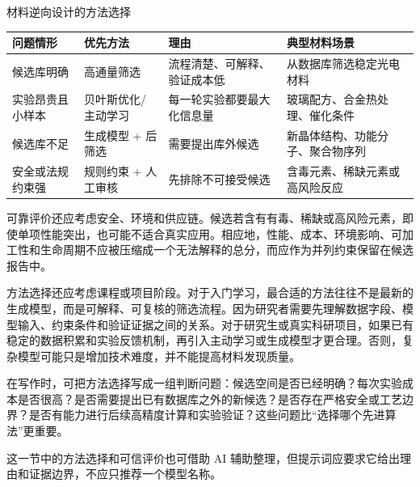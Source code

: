 \begin{formalTable}[htbp]
\caption{材料逆向设计的方法选择}
\label{tab:inverse-design-method-selection}
\begin{tabularx}{\textwidth}{@{}YYYY@{}}
\toprule
\textbf{问题情形} & \textbf{优先方法} & \textbf{理由} & \textbf{典型材料场景} \\
\midrule
候选库明确 & 高通量筛选 & 流程清楚、可解释、验证成本低 & 从数据库筛选稳定光电材料 \\
实验昂贵且小样本 & 贝叶斯优化/主动学习 & 每一轮实验都要最大化信息量 & 玻璃配方、合金热处理、催化条件 \\
候选库不足 & 生成模型 + 后筛选 & 需要提出库外候选 & 新晶体结构、功能分子、聚合物序列 \\
安全或法规约束强 & 规则约束 + 人工审核 & 先排除不可接受候选 & 含毒元素、稀缺元素或高风险反应 \\
\bottomrule
\end{tabularx}
\end{formalTable}

可靠评价还应考虑安全、环境和供应链。候选若含有有毒、稀缺或高风险元素，即使单项性能突出，也可能不适合真实应用。相应地，性能、成本、环境影响、可加工性和生命周期不应被压缩成一个无法解释的总分，而应作为并列约束保留在候选报告中。

方法选择还应考虑课程或项目阶段。对于入门学习，最合适的方法往往不是最新的生成模型，而是可解释、可复核的筛选流程。因为研究者需要先理解数据字段、模型输入、约束条件和验证证据之间的关系。对于研究生或真实科研项目，如果已有稳定的数据积累和实验反馈机制，再引入主动学习或生成模型才更合理。否则，复杂模型可能只是增加技术难度，并不能提高材料发现质量。

在写作时，可把方法选择写成一组判断问题：候选空间是否已经明确？每次实验成本是否很高？是否需要提出已有数据库之外的新候选？是否存在严格安全或工艺边界？是否有能力进行后续高精度计算和实验验证？这些问题比“选择哪个先进算法”更重要。

这一节中的方法选择和可信评价也可借助 AI 辅助整理，但提示词应要求它给出理由和证据边界，不应只推荐一个模型名称。

